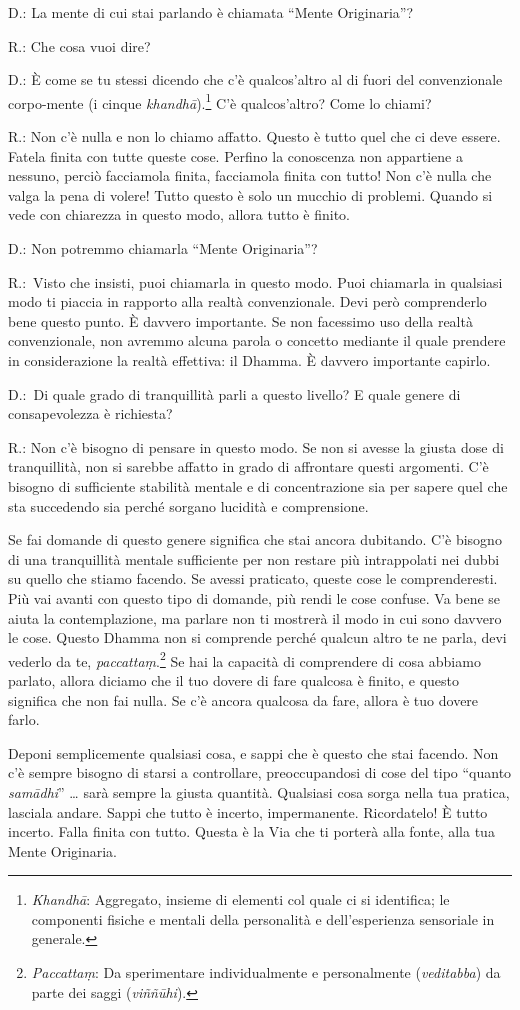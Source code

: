 D.: La mente di cui stai parlando è chiamata ``Mente Originaria''?

R.: Che cosa vuoi dire?

D.: È come se tu stessi dicendo che c'è qualcos'altro al di fuori del
convenzionale corpo-mente (i cinque \emph{khandhā}).\footnote{\emph{Khandhā}:
  Aggregato, insieme di elementi col quale ci si identifica; le
  componenti fisiche e mentali della personalità e dell'esperienza
  sensoriale in generale.} C'è qualcos'altro? Come lo chiami?

R.: Non c'è nulla e non lo chiamo affatto. Questo è tutto quel che ci
deve essere. Fatela finita con tutte queste cose. Perfino la conoscenza
non appartiene a nessuno, perciò facciamola finita, facciamola finita
con tutto! Non c'è nulla che valga la pena di volere! Tutto questo è
solo un mucchio di problemi. Quando si vede con chiarezza in questo
modo, allora tutto è finito.

D.: Non potremmo chiamarla ``Mente Originaria''?

R.:~Visto che insisti, puoi chiamarla in questo modo. Puoi chiamarla in
qualsiasi modo ti piaccia in rapporto alla realtà convenzionale. Devi
però comprenderlo bene questo punto. È davvero importante. Se non
facessimo uso della realtà convenzionale, non avremmo alcuna parola o
concetto mediante il quale prendere in considerazione la realtà
effettiva: il Dhamma. È davvero importante capirlo.

D.:~Di quale grado di tranquillità parli a questo livello? E quale
genere di consapevolezza è richiesta?

R.: Non c'è bisogno di pensare in questo modo. Se non si avesse la
giusta dose di tranquillità, non si sarebbe affatto in grado di
affrontare questi argomenti. C'è bisogno di sufficiente stabilità
mentale e di concentrazione sia per sapere quel che sta succedendo sia
perché sorgano lucidità e comprensione.

Se fai domande di questo genere significa che stai ancora dubitando. C'è
bisogno di una tranquillità mentale sufficiente per non restare più
intrappolati nei dubbi su quello che stiamo facendo. Se avessi
praticato, queste cose le comprenderesti. Più vai avanti con questo tipo
di domande, più rendi le cose confuse. Va bene se aiuta la
contemplazione, ma parlare non ti mostrerà il modo in cui sono davvero
le cose. Questo Dhamma non si comprende perché qualcun altro te ne
parla, devi vederlo da te, \emph{paccattaṃ}.\footnote{\emph{Paccattaṃ}:
  Da sperimentare individualmente e personalmente (\emph{veditabba}) da
  parte dei saggi (\emph{viññūhi}).} Se hai la capacità di comprendere
di cosa abbiamo parlato, allora diciamo che il tuo dovere di fare
qualcosa è finito, e questo significa che non fai nulla. Se c'è ancora
qualcosa da fare, allora è tuo dovere farlo.

Deponi semplicemente qualsiasi cosa, e sappi che è questo che stai
facendo. Non c'è sempre bisogno di starsi a controllare, preoccupandosi
di cose del tipo ``quanto \emph{samādhi}'' \ldots{} sarà sempre la giusta
quantità. Qualsiasi cosa sorga nella tua pratica, lasciala andare. Sappi
che tutto è incerto, impermanente. Ricordatelo! È tutto incerto. Falla
finita con tutto. Questa è la Via che ti porterà alla fonte, alla tua
Mente Originaria.


